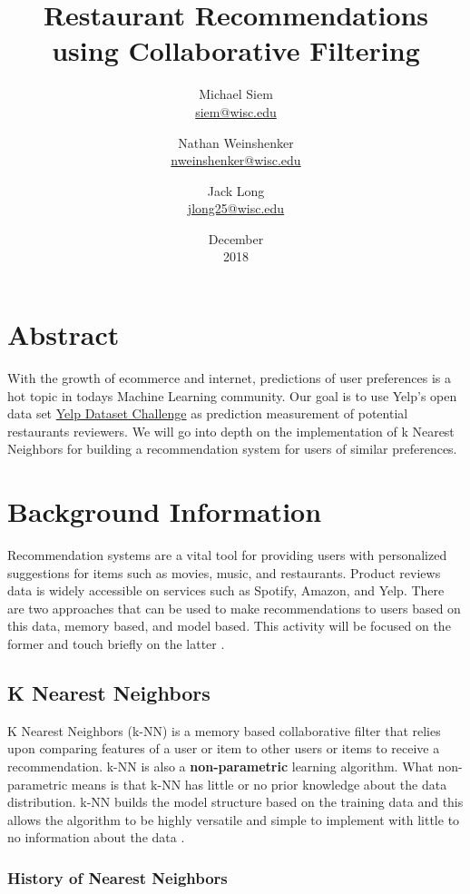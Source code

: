 \documentclass{report}
\title{Restaurant Recommendations using Collaborative Filtering}
\date{December\\ 2018}
\author{Michael Siem \\ \href{mailto:siem@wisc.edu}{siem@wisc.edu}
	\and Nathan Weinshenker \\ \href{mailto:nweinshenker@wisc.edu}{nweinshenker@wisc.edu}
	\and Jack Long \\ \href{mailto:jlong25@wisc.edu}{jlong25@wisc.edu}}
\begin{document}
\maketitle

\section*{Abstract}
With the growth of ecommerce and internet, predictions of user preferences is a hot topic in todays Machine Learning community. Our goal is to use Yelp's open data set \href {https://www.yelp.com/dataset/challenge} {Yelp Dataset Challenge} as prediction measurement of potential restaurants reviewers. We will go into depth on the implementation of k Nearest Neighbors for building a recommendation system for users of similar preferences.  


\section*{Background Information}

Recommendation systems are a vital tool for providing users with personalized suggestions for items such as movies, music, and restaurants.
Product reviews data is widely accessible on services such as Spotify, Amazon, and Yelp.
There are two approaches that can be used to make recommendations to users based on this data, memory based, and model based. This activity will be focused on the former and touch briefly on the latter \cite{5}.
\newline

	
\subsection*{K Nearest Neighbors}
	
K Nearest Neighbors (k-NN) is a memory based collaborative filter that relies upon comparing features of a user or item to other users or items to receive a recommendation. 
k-NN is also a \textbf{non-parametric} learning algorithm. What non-parametric means is that k-NN has little or no prior knowledge about the data distribution. k-NN  builds the model structure based on the training data and this allows the algorithm to be highly versatile and simple to implement with little to no information about the data \cite{3}. 

\subsubsection*{History of Nearest Neighbors}
\end{document}

